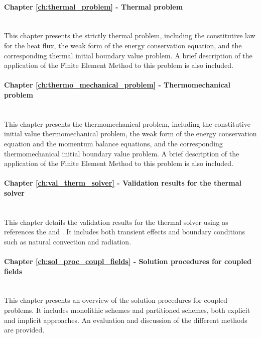 \paragraph{Chapter \ref{ch:thermal_problem} - Thermal problem}\mbox{}\\
This chapter presents the strictly thermal problem, including the constitutive law for the heat flux, the weak form of the energy conservation equation, and the corresponding thermal initial boundary value problem.
A brief description of the application of the Finite Element Method to this problem is also included.

\paragraph{Chapter \ref{ch:thermo_mechanical_problem} - Thermomechanical problem}\mbox{}\\
This chapter presents the thermomechanical problem, including the constitutive initial value thermomechanical problem, the weak form of the energy conservation equation and the momentum balance equations, and the corresponding thermomechanical initial boundary value problem.
A brief description of the application of the Finite Element Method to this problem is also included.

\paragraph{Chapter \ref{ch:val_therm_solver} - Validation results for the thermal solver}\mbox{}\\
This chapter details the validation results for the thermal solver using as references the \cite{DINEN1991_1_2} and \cite{NAFEMSbenchmarks}.
It includes both transient effects and boundary conditions such as natural convection and radiation.

\paragraph{Chapter \ref{ch:sol_proc_coupl_fields} - Solution procedures for coupled fields}\mbox{}\\
This chapter presents an overview of the solution procedures for coupled problems.
It includes monolithic schemes and partitioned schemes, both explicit and implicit approaches.
An evaluation and discussion of the different methods are provided.

